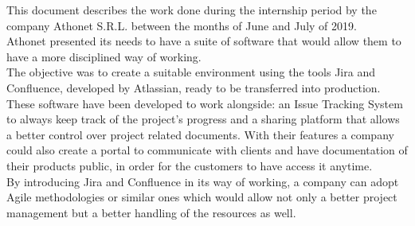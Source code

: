 
This document describes the work done during the internship period by the company Athonet S.R.L. between the months of June and July of 2019.\\
Athonet presented its needs to have a suite of software that would allow them to have a more disciplined way of working.\\
The objective was to create a suitable environment using the tools Jira and Confluence, developed by Atlassian, ready to be transferred into production.\\
These software have been developed to work alongside: an Issue Tracking System to always keep track of the project's progress and a sharing platform that allows a better control over project related documents.
With their features a company could also create a portal to communicate with clients and have documentation of their products public, in order for the customers to have access it anytime.\\
By introducing Jira and Confluence in its way of working, a company can adopt Agile methodologies or similar ones which would allow not only a better project management but a better handling of the resources as well.